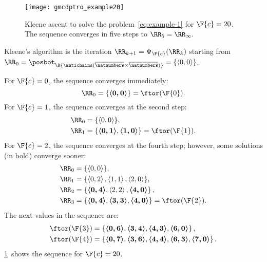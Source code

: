 \begin{figure}
  \begin{centering}
    \texttt{[image: gmcdptro\_example20]}
  \end{centering}
  \caption{\label{fig:example24}Kleene ascent to solve the problem~\cref{eq:example-1}
  for $\F{c}=20$. The sequence converges in five steps to $\RR_{5}=\RR_{\infty}.$ }
\end{figure}

\noindent Kleene's algorithm is the iteration $\RR_{k+1}=\Psi_{\F{c}}(\RR_{k})$
starting from $\RR_{0}=\posbot_{\R{\antichains(\overline{\natnumbers}\times\overline{\natnumbers})}}=\{\left\langle 0,0\right\rangle \}$.

\noindent For $\F{c}=0$, the sequence converges immediately:
\[
  \RR_{0}=\{\boldsymbol{\left\langle 0,0\right\rangle }\}=\ftor(\F{0}).
\]
For $\F{c}=1$, the sequence converges at the second step:
\begin{align*}
  \RR_{0} & =\{\left\langle 0,0\right\rangle \},\\
  \RR_{1} & =\{\boldsymbol{\left\langle 0,1\right\rangle },\boldsymbol{\left\langle 1,0\right\rangle }\}=\ftor(\F{1}).
\end{align*}
For $\F{c}=2$, the sequence converges at the fourth step; however,
some solutions (in bold) converge sooner:
\begin{align*}
  \RR_{0} & =\{\left\langle 0,0\right\rangle \},\\
  \RR_{1} & =\{\left\langle 0,2\right\rangle ,\left\langle 1,1\right\rangle ,\left\langle 2,0\right\rangle \},\\
  \RR_{2} & =\left\{ \boldsymbol{\left\langle 0,4\right\rangle },\left\langle 2,2\right\rangle ,\boldsymbol{\left\langle 4,0\right\rangle }\right\} ,\\
  \RR_{3} & =\{\boldsymbol{\left\langle 0,4\right\rangle },\boldsymbol{\left\langle 3,3\right\rangle },\boldsymbol{\left\langle 4,0\right\rangle }\}=\ftor(\F{2}).
\end{align*}
The next values in the sequence are:
\begin{align*}
  \ftor(\F{3}) & =\left\{ \boldsymbol{\left\langle 0,6\right\rangle },\boldsymbol{\left\langle 3,4\right\rangle },\boldsymbol{\left\langle 4,3\right\rangle },\boldsymbol{\left\langle 6,0\right\rangle }\right\} ,\\
  \ftor(\F{4}) & =\left\{ \boldsymbol{\left\langle 0,7\right\rangle },\boldsymbol{\left\langle 3,6\right\rangle },\boldsymbol{\left\langle 4,4\right\rangle },\boldsymbol{\left\langle 6,3\right\rangle },\boldsymbol{\left\langle 7,0\right\rangle }\right\} .
\end{align*}
\cref{fig:example24}~shows the sequence for $\F{c}=20$.

